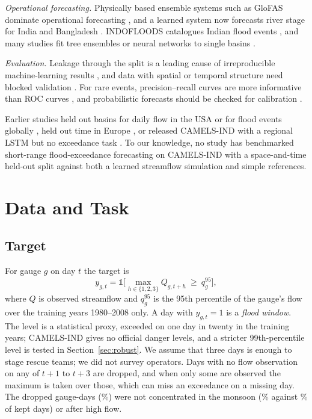 \documentclass[conference]{IEEEtran}
\begin{document}
\textit{Operational forecasting.} Physically based ensemble systems such as GloFAS \cite{Alfieri2013} dominate operational forecasting \cite{Cloke2009}, and a learned system now forecasts river stage for India and Bangladesh \cite{Nevo2022}. INDOFLOODS catalogues Indian flood events \cite{Kuntla2025}, and many studies fit tree ensembles or neural networks to single basins \cite{Mosavi2018}.

\textit{Evaluation.} Leakage through the split is a leading cause of irreproducible machine-learning results \cite{Kapoor2023}, and data with spatial or temporal structure need blocked validation \cite{Roberts2017}. For rare events, precision--recall curves are more informative than ROC curves \cite{Saito2015}, and probabilistic forecasts should be checked for calibration \cite{Brier1950}.

Earlier studies held out basins for daily flow in the USA \cite{Kratzert2019b} or for flood events globally \cite{Nearing2024}, held out time in Europe \cite{Kirschstein2024}, or released CAMELS-IND with a regional LSTM but no exceedance task \cite{Mangukiya2025}. To our knowledge, no study has benchmarked short-range flood-exceedance forecasting on CAMELS-IND with a space-and-time held-out split against both a learned streamflow simulation and simple references.

\section{Data and Task}
\subsection{Target}
For gauge $g$ on day $t$ the target is
\begin{equation}
y_{g,t}=\mathbb{1}\Big[\max_{h\in\{1,2,3\}} Q_{g,t+h}\ \ge\ q^{95}_g\Big],
\label{eq:target}
\end{equation}
where $Q$ is observed streamflow and $q^{95}_g$ is the 95th percentile of the gauge's flow over the training years 1980--2008 only. A day with $y_{g,t}=1$ is a \emph{flood window}. The level is a statistical proxy, exceeded on one day in twenty in the training years; CAMELS-IND gives no official danger levels, and a stricter 99th-percentile level is tested in Section~\ref{sec:robust}. We assume that three days is enough to stage rescue teams; we did not survey operators. Days with no flow observation on any of $t{+}1$ to $t{+}3$ are dropped, and when only some are observed the maximum is taken over those, which can miss an exceedance on a missing day. The \DropN{} dropped gauge-days (\DropPct\%) were not concentrated in the monsoon (\DropMon\% against \KeptMon\% of kept days) or after high flow.
\end{document}
